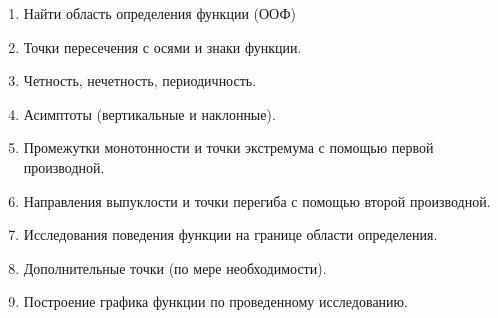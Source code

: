 \documentclass[a4paper,12pt]{article}
\theoremstyle{plain} %
\theoremstyle{definition} %
\theoremstyle{remark} %
\begin{document}
\begin{enumerate}
    \item Найти область определения функции (ООФ)
    \item Точки пересечения с осями и знаки функции. 
    \item Четность, нечетность, периодичность. 
    \item Асимптоты (вертикальные и наклонные).
    \item Промежутки монотонности и точки экстремума с помощью первой производной. 
    \item Направления выпуклости и точки перегиба с помощью второй производной. 
    \item Исследования поведения функции на границе области определения. 
    \item Дополнительные точки (по мере необходимости).
    \item Построение графика функции по проведенному исследованию.
\end{enumerate}
\end{document}
